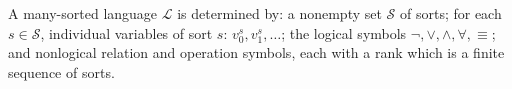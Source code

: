 A many-sorted language $\mathcal{L}$ is determined by: a nonempty set $\mathcal{S}$ of sorts; for each $s \in \mathcal{S}$, individual variables of sort $s$: $v_0^s, v_1^s, \dots$; the logical symbols $\neg, \lor, \land, \forall, \equiv$; and nonlogical relation and operation symbols, each with a rank which is a finite sequence of sorts.
